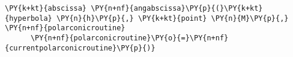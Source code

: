 \begin{Verbatim}[commandchars=\\\{\}]
      \PY{k+kt}{abscissa} \PY{n+nf}{angabscissa}\PY{p}{(}\PY{k+kt}{hyperbola} \PY{n}{h}\PY{p}{,} \PY{k+kt}{point} \PY{n}{M}\PY{p}{,} \PY{n+nf}{polarconicroutine}
      \PY{n+nf}{polarconicroutine}\PY{o}{=}\PY{n+nf}{currentpolarconicroutine}\PY{p}{)}
\end{Verbatim}
